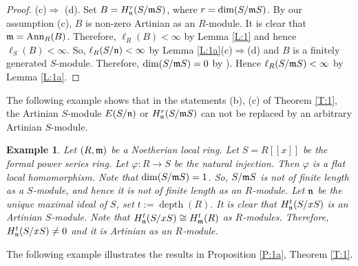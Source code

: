 \documentclass[a4papersize]{article}
\newtheorem{example}[theorem]{Example}
\DeclareMathOperator{\depth}{depth}
\DeclareMathOperator{\Ann}{Ann}
\begin{document}
\begin{proof}
(c)$\Rightarrow$ (d). Set $B=H^r_{\frak n}(S/\frak mS)$, where $r=\dim(S/\frak mS)$. By our assumption (c), $B$ is non-zero Artinian as an $R$-module. It is clear that $\frak m=\Ann_R(B)$. Therefore, $\ell_R(B)<\infty$ by Lemma \ref{L:1} and hence $\ell_S(B)<\infty.$ So, $\ell_R(S/\frak n)<\infty$ by Lemma \ref{L:1a}(c)$\Rightarrow$(d) and $B$ is a finitely generated $S$-module. Therefore, $\dim (S/\frak mS)=0$ by \cite[Corollary 7.3.3]{BS}). Hence $\ell_R(S/\frak m S)<\infty$ by Lemma \ref{L:1a}.
\end{proof}

The following example shows that in the statements (b), (c) of Theorem \ref{T:1}, the Artinian $S$-module $E(S/\frak n)$ or $H^r_{\frak n}(S/\frak mS)$ can not be replaced by an arbitrary Artinian $S$-module. 

\begin{example} \label{E:1} {\rm Let $(R,\frak m)$ be a Noetherian local ring. Let $S=R[[x]]$ be the formal power series ring.  Let $\varphi: R\rightarrow S$ be the natural injection. Then $\varphi$ is a flat local homomorphism. Note that $\dim (S/\frak mS)=1$. So, $S/\frak mS$ is not of finite length as a $S$-module, and hence it is not of finite length as an $R$-module. Let $\frak n$ be the unique maximal ideal of $S$, set $t:=\depth (R).$ It is clear that $H^t_{\frak n}(S/xS)$ is an Artinian $S$-module. Note that $H^t_{\frak n}(S/xS)\cong H^t_{\frak m}(R)$ as $R$-modules. Therefore, $H^t_{\frak n}(S/xS)\neq 0$ and it is  Artinian as an $R$-module.}  
\end{example}

The following example illustrates the results in  Proposition \ref{P:1a}, Theorem \ref{T:1}.
\end{document}
